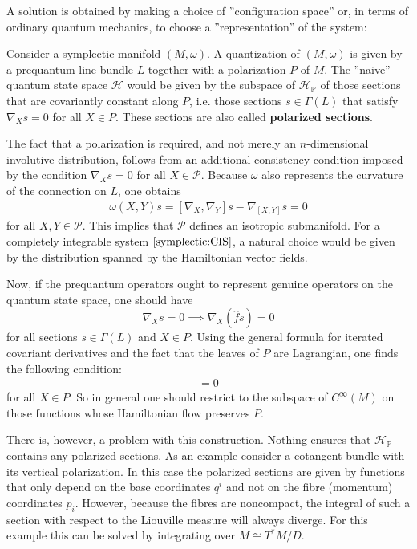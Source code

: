     A solution is obtained by making a choice of ''configuration space'' or, in terms of ordinary quantum mechanics, to choose a ''representation'' of the system:
    \begin{construct}[Quantization]
        Consider a symplectic manifold $(M,\omega)$. A quantization of $(M,\omega)$ is given by a prequantum line bundle $L$ together with a polarization $P$ of $M$. The ''naive'' quantum state space $\mathcal{H}$ would be given by the subspace of $\mathcal{H}_{\mathbb{P}}$ of those sections that are covariantly constant along $P$, i.e. those sections $s\in\Gamma(L)$ that satisfy $\nabla_Xs=0$ for all $X\in P$. These sections are also called \textbf{polarized sections}.

        The fact that a polarization is required, and not merely an $n$-dimensional involutive distribution, follows from an additional consistency condition imposed by the condition $\nabla_Xs=0$ for all $X\in\mathcal{P}$. Because $\omega$ also represents the curvature of the connection on $L$, one obtains
        \begin{gather}
            \omega(X,Y)s = [\nabla_X,\nabla_Y]s - \nabla_{[X,Y]}s = 0
        \end{gather}
        for all $X,Y\in\mathcal{P}$. This implies that $\mathcal{P}$ defines an isotropic submanifold. For a completely integrable system $\ref{symplectic:CIS}$, a natural choice would be given by the distribution spanned by the Hamiltonian vector fields.

        Now, if the prequantum operators ought to represent genuine operators on the quantum state space, one should have \[\nabla_Xs=0\implies\nabla_X(\hat{f}s)=0\] for all sections $s\in\Gamma(L)$ and $X\in P$. Using the general formula for iterated covariant derivatives and the fact that the leaves of $P$ are Lagrangian, one finds the following condition:
        \begin{gather}
            [X,X_f]=0
        \end{gather}
        for all $X\in P$. So in general one should restrict to the subspace of $C^\infty(M)$ on those functions whose Hamiltonian flow preserves $P$.

        There is, however, a problem with this construction. Nothing ensures that $\mathcal{H}_{\mathbb{P}}$ contains any polarized sections. As an example consider a cotangent bundle with its vertical polarization. In this case the polarized sections are given by functions that only depend on the base coordinates $q^i$ and not on the fibre (momentum) coordinates $p_i$. However, because the fibres are noncompact, the integral of such a section with respect to the Liouville measure will always diverge. For this example this can be solved by integrating over $M\cong T^*M/D$.
    \end{construct}

